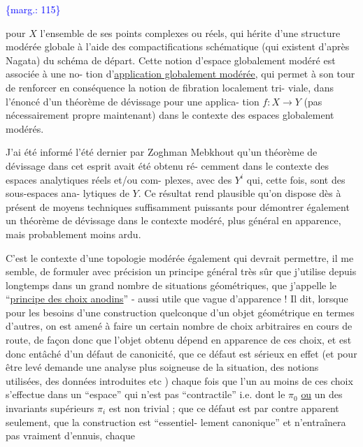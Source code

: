 \documentclass[11pt]{article}
\newcommand{\scanpage}[1]{\par\bigskip\noindent{\small\sffamily[scan #1]}\par}
\newcommand{\mspage}[1]{{\small\sffamily[p.\,#1]}}
\newcommand{\margin}[1]{\textcolor{blue}{\{\textsf{marg.:} #1\}}}
\newcommand{\uline}[1]{\underline{#1}}
\begin{document}
\margin{115}

\clearpage
\scanpage{119/116}
\mspage{38}

pour  $X$  l'ensemble de ses points complexes ou réels, qui hérite
d'une structure modérée globale à l'aide des compactifications
schématique (qui existent d'après Nagata) du schéma de départ.
Cette notion d'espace globalement modéré est associée à une no-%
tion d'\uline{application globalement modérée}, qui permet à son tour de
renforcer en conséquence la notion de fibration localement tri-%
viale, dans l'énoncé d'un théorème de dévissage pour une applica-%
tion  $f : X \longrightarrow Y$  (pas nécessairement propre maintenant) dans
le contexte des espaces globalement modérés.

J'ai été informé l'été dernier par Zoghman Mebkhout
qu'un théorème de dévissage dans cet esprit avait été obtenu ré-%
cemment dans le contexte des espaces analytiques réels et/ou com-%
plexes, avec des  $Y^{i}$  qui, cette fois, sont des sous-espaces ana-%
lytiques de  $Y$. Ce résultat rend plausible qu'on dispose dès à
présent de moyens techniques suffisamment puissants pour démontrer
également un théorème de dévissage dans le contexte modéré, plus
général en apparence, mais probablement moins ardu.

C'est le contexte d'une topologie modérée également
qui devrait permettre, il me semble, de formuler avec précision
un principe général très sûr que j'utilise depuis longtemps dans
un grand nombre de situations géométriques, que j'appelle le
``\uline{principe des choix anodins}'' - aussi utile que vague d'apparence !
Il dit, lorsque pour les besoins d'une construction quelconque
d'un objet géométrique en termes d'autres, on est amené à faire
un certain nombre de choix arbitraires en cours de route, de façon
donc que l'objet obtenu dépend en apparence de ces choix, et est
donc entâché d'un défaut de canonicité, que ce défaut est sérieux
en effet (et pour être levé demande une analyse plus soigneuse de
la situation, des notions utilisées, des données introduites etc )
chaque fois que l'un au moins de ces choix s'effectue dans un
``espace'' qui n'est pas ``contractile'' i.e. dont le  $\pi_{0}$  \uline{ou} un des
invariants supérieurs  $\pi_{i}$  est non trivial ; que ce défaut est
par contre apparent seulement, que la construction est ``essentiel-%
lement canonique'' et n'entraînera pas vraiment d'ennuis, chaque
\end{document}
